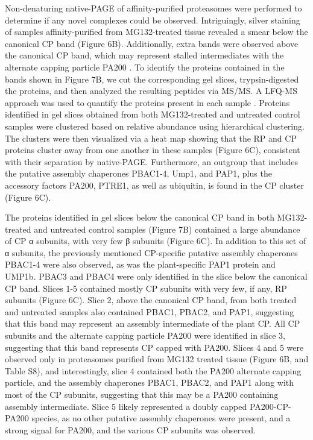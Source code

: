 	Non-denaturing native-PAGE of affinity-purified proteasomes were performed to determine if any novel complexes could be observed. Intriguingly, silver staining of samples affinity-purified from MG132-treated tissue revealed a smear below the canonical CP band (Figure 6B). Additionally, extra bands were observed above the canonical CP band, which may represent stalled intermediates with the alternate capping particle PA200 \citep{li07}. To identify the proteins contained in the bands shown in Figure 7B, we cut the corresponding gel slices, trypsin-digested the proteins, and then analyzed the resulting peptides via MS/MS. A LFQ-MS approach was used to quantify the proteins present in each sample \citep{gemperline16}. Proteins identified in gel slices obtained from both MG132-treated and untreated control samples were clustered based on relative abundance using hierarchical clustering. The clusters were then visualized via a heat map showing that the RP and CP proteins cluster away from one another in these samples (Figure 6C), consistent with their separation by native-PAGE. Furthermore, an outgroup that includes the putative assembly chaperones PBAC1-4, Ump1, and PAP1, plus the accessory factors PA200, PTRE1, as well as ubiquitin, is found in the CP cluster (Figure 6C).

	The proteins identified in gel slices below the canonical CP band in both MG132-treated and untreated control samples (Figure 7B) contained a large abundance of CP α subunits, with very few β subunits (Figure 6C). In addition to this set of α subunits, the previously mentioned CP-specific putative assembly chaperones PBAC1-4 were also observed, as was the plant-specific PAP1 protein and UMP1b. PBAC3 and PBAC4 were only identified in the slice below the canonical CP band. Slices 1-5 contained mostly CP subunits with very few, if any, RP subunits (Figure 6C). Slice 2, above the canonical CP band, from both treated and untreated samples also contained PBAC1, PBAC2, and PAP1, suggesting that this band may represent an assembly intermediate of the plant CP. All CP subunits and the alternate capping particle PA200 were identified in slice 3, suggesting that this band represents CP capped with PA200. Slices 4 and 5 were observed only in proteasomes purified from MG132 treated tissue (Figure 6B, and Table S8), and interestingly, slice 4 contained both the PA200 alternate capping particle, and the assembly chaperones PBAC1, PBAC2, and PAP1 along with most of the CP subunits, suggesting that this may be a PA200 containing assembly intermediate. Slice 5 likely represented a doubly capped PA200-CP-PA200 species, as no other putative assembly chaperones were present, and a strong signal for PA200, and the various CP subunits was observed. 

